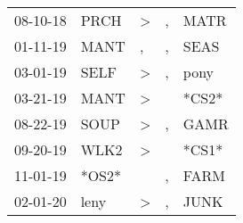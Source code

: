 \begin{supertabular}{p{0.07\textwidth}p{0.06\textwidth}p{0.02\textwidth}p{0.02\textwidth}p{0.06\textwidth}}
          08-10-18\textsuperscript{} &           PRCH\textsuperscript{} &     \textgreater &             , &           MATR\textsuperscript{} \\
          01-11-19\textsuperscript{} &           MANT\textsuperscript{} &                , &             , &           SEAS\textsuperscript{} \\
          03-01-19\textsuperscript{} &           SELF\textsuperscript{} &     \textgreater &             , &           pony\textsuperscript{} \\
          03-21-19\textsuperscript{} &           MANT\textsuperscript{} &     \textgreater &               &                            *CS2* \\
          08-22-19\textsuperscript{} &           SOUP\textsuperscript{} &     \textgreater &             , &           GAMR\textsuperscript{} \\
          09-20-19\textsuperscript{} &           WLK2\textsuperscript{} &     \textgreater &               &                            *CS1* \\
          11-01-19\textsuperscript{} &                            *OS2* &                  &             , &           FARM\textsuperscript{} \\
          02-01-20\textsuperscript{} &           leny\textsuperscript{} &     \textgreater &             , &           JUNK\textsuperscript{} \\
\end{supertabular}
